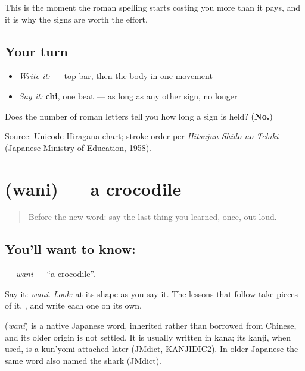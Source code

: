This is the moment the roman spelling starts costing you more than it pays, and it is why the signs are worth the effort.

\subsection*{Your turn}
\begin{itemize}
\raggedright
  \item \emph{Write it:}  — top bar, then the body in one movement
  \item \emph{Say it:} \textbf{chi}, one beat — as long as any other sign, no longer
\end{itemize}

\begin{tcolorbox}[breakable,colback=teal!4,colframe=teal!35!black,title={Before you move on}]
Does the number of roman letters tell you how long a sign is held? (\textbf{No.})

Source: \href{https://www.unicode.org/charts/PDF/U3040.pdf}{Unicode Hiragana chart}; stroke order per \emph{Hitsujun Shido no Tebiki} (Japanese Ministry of Education, 1958).
\end{tcolorbox}
\section[\texorpdfstring{\ja{わに} (wani)}{わに (wani)}]{ (wani) — a crocodile}

\label{lesson:JA-C02-wani}



\begin{quote}
Before the new word: say the last thing you learned, once, out loud.
\end{quote}

\subsection*{You'll want to know: }
\textbf{} — \emph{wani} — \textquotedblleft{}a crocodile\textquotedblright{}.

Say it: \emph{wani}. \emph{Look:} at its shape as you say it. The lessons that follow take pieces of it, \textbf{}, and write each one on its own.

\begin{cousinweb}
\textbf{} (\emph{wani}) is a native Japanese word, inherited rather than borrowed from Chinese, and its older origin is not settled. It is usually written in kana; its kanji, when used, is a kun'yomi attached later (JMdict, KANJIDIC2). In older Japanese the same word also named the shark (JMdict).
\end{cousinweb}

